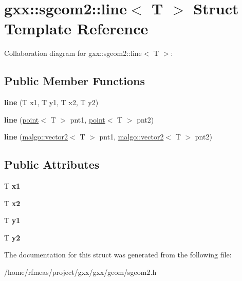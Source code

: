 \hypertarget{structgxx_1_1sgeom2_1_1line}{}\section{gxx\+:\+:sgeom2\+:\+:line$<$ T $>$ Struct Template Reference}
\label{structgxx_1_1sgeom2_1_1line}


Collaboration diagram for gxx\+:\+:sgeom2\+:\+:line$<$ T $>$\+:
\subsection*{Public Member Functions}
\begin{DoxyCompactItemize}
\item 
{\bfseries line} (T x1, T y1, T x2, T y2)\hypertarget{structgxx_1_1sgeom2_1_1line_aaccf6f428ed7c1ef910f65c87e0684db}{}\label{structgxx_1_1sgeom2_1_1line_aaccf6f428ed7c1ef910f65c87e0684db}

\item 
{\bfseries line} (\hyperlink{structgxx_1_1sgeom2_1_1point}{point}$<$ T $>$ pnt1, \hyperlink{structgxx_1_1sgeom2_1_1point}{point}$<$ T $>$ pnt2)\hypertarget{structgxx_1_1sgeom2_1_1line_aca58c8c6e2c80a8dceda31e467704dfc}{}\label{structgxx_1_1sgeom2_1_1line_aca58c8c6e2c80a8dceda31e467704dfc}

\item 
{\bfseries line} (\hyperlink{classmalgo_1_1vector2}{malgo\+::vector2}$<$ T $>$ pnt1, \hyperlink{classmalgo_1_1vector2}{malgo\+::vector2}$<$ T $>$ pnt2)\hypertarget{structgxx_1_1sgeom2_1_1line_a04895470393b743009cc7b9981407a3b}{}\label{structgxx_1_1sgeom2_1_1line_a04895470393b743009cc7b9981407a3b}

\end{DoxyCompactItemize}
\subsection*{Public Attributes}
\begin{DoxyCompactItemize}
\item 
T {\bfseries x1}\hypertarget{structgxx_1_1sgeom2_1_1line_a4569a4ebf6a9b0f8c05cf80dfa6651f8}{}\label{structgxx_1_1sgeom2_1_1line_a4569a4ebf6a9b0f8c05cf80dfa6651f8}

\item 
T {\bfseries x2}\hypertarget{structgxx_1_1sgeom2_1_1line_a161e3ee318ae934d8dd6a4e080f074bd}{}\label{structgxx_1_1sgeom2_1_1line_a161e3ee318ae934d8dd6a4e080f074bd}

\item 
T {\bfseries y1}\hypertarget{structgxx_1_1sgeom2_1_1line_ac732fc6289fefd03983304e077d7bc28}{}\label{structgxx_1_1sgeom2_1_1line_ac732fc6289fefd03983304e077d7bc28}

\item 
T {\bfseries y2}\hypertarget{structgxx_1_1sgeom2_1_1line_ad16c60a81b9246f41c9d1cf87f4f7eb1}{}\label{structgxx_1_1sgeom2_1_1line_ad16c60a81b9246f41c9d1cf87f4f7eb1}

\end{DoxyCompactItemize}


The documentation for this struct was generated from the following file\+:\begin{DoxyCompactItemize}
\item 
/home/rfmeas/project/gxx/gxx/geom/sgeom2.\+h\end{DoxyCompactItemize}
